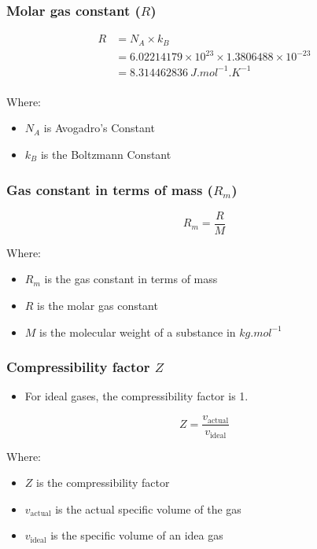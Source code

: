 \documentclass[11pt]{article}
\begin{document}
\subsubsection{Molar gas constant (\(R\))}
\label{sec:org2692432}
\begin{align*}
R &= N_A \times k_B \\
&= 6.02214179 \times 10^{23} \times 1.3806488 \times 10^{-23} \\
&= \qty{8.314462836}{J.mol^{-1}.K^{-1}} \\
\end{align*}

Where:
\begin{itemize}
\item \(N_A\) is Avogadro's Constant
\item \(k_B\) is the Boltzmann Constant
\end{itemize}

\subsubsection{Gas constant in terms of mass (\(R_m\))}
\label{sec:org3c59214}
\[R_m = \frac{R}{M}\]

Where:
\begin{itemize}
\item \(R_m\) is the gas constant in terms of mass
\item \(R\) is the molar gas constant
\item \(M\) is the molecular weight of a substance in \(\unit{kg.mol^{-1}}\)
\end{itemize}

\subsubsection{Compressibility factor \(Z\)}
\label{sec:orgf0da123}
\begin{itemize}
\item For ideal gases, the compressibility factor is 1.
\end{itemize}

\[Z = \frac{v_{\text{actual}}}{v_{\text{ideal}}}\]

Where:
\begin{itemize}
\item \(Z\) is the compressibility factor
\item \(v_{\text{actual}}\) is the actual specific volume of the gas
\item \(v_{\text{ideal}}\) is the specific volume of an idea gas
\end{itemize}
\end{document}
